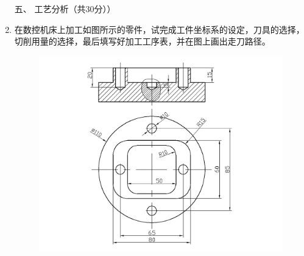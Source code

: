\documentclass[12pt,twocolumn,landscape,UTF8,twoside]{ctexart}
\begin{document}
\begin{spacing}{1.3}
\begin{enumerate} [1、]
%
%
%
%
%

\item[\heiti 五、] {\heiti 工艺分析（共30分））}

\item 在数控机床上加工如图所示的零件，试完成工件坐标系的设定，刀具的选择，切削用量的选择，最后填写好加工工序表，并在图上画出走刀路径。
\begin{figure}[pht]
	\centering
	\includegraphics[width=0.5\linewidth,trim=220 10 250 10,clip]{image/2.jpg}
	\label{fig:2}
\end{figure}


\end{enumerate}
\end{spacing}
\end{document}
